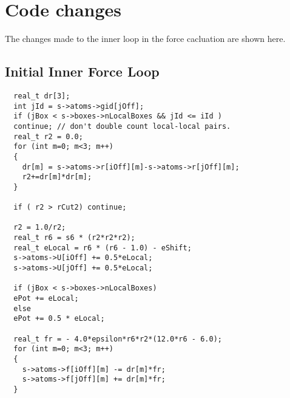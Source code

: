 \documentclass[12pt]{article}
\begin{document}


\appendix
\section{Code changes}
\label{apd:code-changes}
The changes made to the inner loop in the force cacluation are shown
here.
\subsection{Initial Inner Force Loop}
\begin{lstlisting}
  real_t dr[3];
  int jId = s->atoms->gid[jOff];  
  if (jBox < s->boxes->nLocalBoxes && jId <= iId )
  continue; // don't double count local-local pairs.
  real_t r2 = 0.0;
  for (int m=0; m<3; m++)
  {
    dr[m] = s->atoms->r[iOff][m]-s->atoms->r[jOff][m];
    r2+=dr[m]*dr[m];
  }

  if ( r2 > rCut2) continue;

  r2 = 1.0/r2;
  real_t r6 = s6 * (r2*r2*r2);
  real_t eLocal = r6 * (r6 - 1.0) - eShift;
  s->atoms->U[iOff] += 0.5*eLocal;
  s->atoms->U[jOff] += 0.5*eLocal;

  if (jBox < s->boxes->nLocalBoxes)
  ePot += eLocal;
  else
  ePot += 0.5 * eLocal;

  real_t fr = - 4.0*epsilon*r6*r2*(12.0*r6 - 6.0);
  for (int m=0; m<3; m++)
  {
    s->atoms->f[iOff][m] -= dr[m]*fr;
    s->atoms->f[jOff][m] += dr[m]*fr;
  }
\end{lstlisting}
\end{document}
